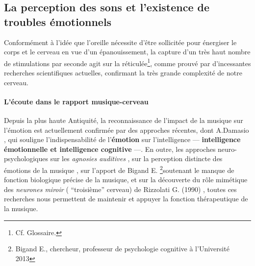 \subsection{La perception des sons et l'existence de troubles
  émotionnels}


Conformément à l'idée que l'oreille nécessite d'être sollicitée pour
énergiser le corps et le cerveau en vue d'un épanouissement, la
capture d'un très haut nombre de stimulations par seconde agit
sur la \gls{réticulée}\footnote {Cf. Glossaire.},
comme prouvé par d'incessantes recherches scientifiques actuelles,
confirmant la très grande complexité de notre cerveau.






                

\paragraph{ L'écoute dans le rapport
  musique-cerveau}

Depuis la plus haute Antiquité,  la reconnaissance de
l'impact de la musique sur l'émotion est actuellement confirmée par
des approches récentes, dont A.Damasio  \autocite {damasio:lautre},
qui souligne l'indispensabilité de l'\textbf{émotion}
sur l'intelligence   ---     \textbf{intelligence émotionnelle et intelligence
  cognitive} ---.
En outre, les approches neuro-psychologiques sur les \textit{agnosies
  auditives} \autocite[ pp. 205--216]{seron.baron.ea:neuropsychologie},
sur la perception distincte des émotions de la musique
\autocite[pp. 223--224]{platel_neuropsychology_2002}, 
sur l'apport de Bigand E. \autocite[Ch. 3
p. 35, "Vous avez l'oreille musicale"]{bigand:cerveau} \footnote {Bigand E., chercheur, professeur 
de psychologie cognitive à l'Université 2013 }soutenant le
manque de fonction biologique précise de la musique,
et sur la
découverte du rôle mimétique des\textit{ neurones miroir }( ``troisième''
cerveau) de Rizzolati G. (1990)
\autocite[118--119]{van_eersel_cerveau}, 
toutes ces recherches nous permettent de maintenir et
appuyer 
la fonction thérapeutique de la musique.








